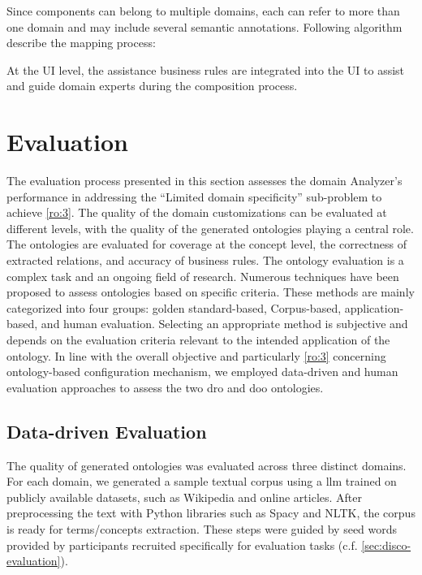 Since components can belong to multiple domains, each can refer to more
than one domain and may include several semantic annotations. Following
algorithm describe the mapping process:

At the UI level, the assistance business rules are integrated into the UI to assist and guide domain experts during the composition process.


\vspace{-15pt}
\hypertarget{sec:onto.evaluation}{%
\section{Evaluation}\label{sec:onto.evaluation}}
\vspace{10pt}
The evaluation process presented in this section assesses the domain Analyzer’s performance in addressing the “Limited domain specificity” sub-problem to achieve \cref{ro:3}. The quality of the domain customizations can be evaluated at different levels, with the quality of the generated ontologies playing a central role. The ontologies are evaluated for coverage at the concept level, the correctness of extracted relations, and accuracy of business rules. 
The ontology evaluation is a complex task and an ongoing field of research. Numerous techniques have been proposed to assess ontologies based on specific criteria. These methods are mainly categorized into four groups: golden standard-based, Corpus-based, application-based, and human evaluation. Selecting an appropriate method is subjective and depends on the evaluation criteria relevant to the intended application of the ontology. In line with the overall objective and particularly \cref{ro:3} concerning ontology-based configuration mechanism, we employed data-driven and human evaluation approaches to assess the two \gls{dro} and \gls{doo} ontologies.

\vspace{-15pt}
\hypertarget{sec:onto.evaluation-data}{%
\subsection{Data-driven Evaluation}\label{sec:onto.evaluation-data}}
\vspace{10pt}

The quality of generated ontologies was evaluated across three distinct domains. For each domain, we generated a sample textual corpus using a \gls{llm} trained on publicly available datasets, such as Wikipedia and online articles. After preprocessing the text with Python libraries such as Spacy and NLTK, the corpus is ready for terms/concepts extraction. These steps were guided by seed words provided by participants recruited specifically for evaluation tasks (c.f. \cref{sec:disco-evaluation}). 


